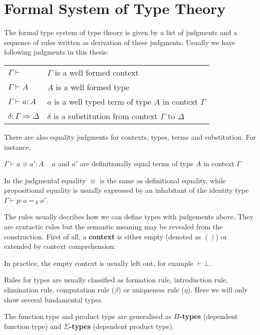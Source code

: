 \section{Formal System of Type Theory}

The formal type system of type theory is given by a list of judgments and a sequence of rules written as derivation of these judgments. Usually we have following judgments in this thesis:


\begin{tabular}{l l}
$\Gamma \vdash$ & $\Gamma$  is a well formed context \\
$\Gamma \vdash A$ & $A$  is a well formed type \\
$\Gamma \vdash a : A$ & $a$ is a well typed term of type $A$ in context $\Gamma$ \\
$\delta : \Gamma \Rightarrow \Delta$ & $\delta$ is a substitution from context $\Gamma$ to $\Delta$ \\
\end{tabular}

There are also equality judgments for contexts, types, terms and substitution. For instance,

$\Gamma \vdash a \equiv a' : A$  ~ $a$ and $a'$ are definitionally equal terms of type $A$ in context $\Gamma$

In \itt the judgmental equality $\equiv$ is the same as definitional equality, while propositional equality is usually expressed by an inhabitant of the identity type $\Gamma \vdash p: a =_{A} a' $.



The rules usually decribes how we can define types with judgements above. They are syntactic rules but the semantic meaning may be revealed from the construction.
First of all, a \textbf{context} is either empty (denoted as $()$) or extended by context comprehension:


In practice, the empty context is usually left out, for example $\vdash \bot$.


Rules for types are usually classified as formation rule, introduction rule, elimination rule, computation rule ($\beta$) or uniqueness rule ($\eta$). Here we will only show several fundamental types.

The function type and product type are generalised as \textbf{$\Pi$-types} (dependent function type) and \textbf{$\Sigma$-types} (dependent product type).

